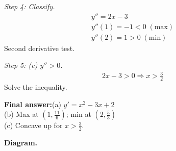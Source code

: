 \documentclass[11pt]{article}
\begin{document}
\textit{Step 4: Classify.}
\[\begin{gathered}
y'' = 2x - 3 \\ y''(1) = -1 < 0\; (\text{max}) \\ y''(2) = 1 > 0\; (\text{min})
\end{gathered}\]
Second derivative test.

\textit{Step 5: (c) \( y'' > 0 \).}
\[\begin{gathered}
2x - 3 > 0 \Rightarrow x > \tfrac{3}{2}
\end{gathered}\]
Solve the inequality.

\begin{answerbox}
\textbf{Final answer:}\quad (a) \(\displaystyle  y' = x^2 - 3x + 2 \) \\[3pt]  (b) Max at \(\displaystyle  (1, \tfrac{11}{6}) \); min at \(\displaystyle  (2, \tfrac{5}{3}) \) \\[3pt]  (c) Concave up for \(\displaystyle  x > \tfrac{3}{2} \).
\end{answerbox}
\textbf{Diagram.}
\end{document}
